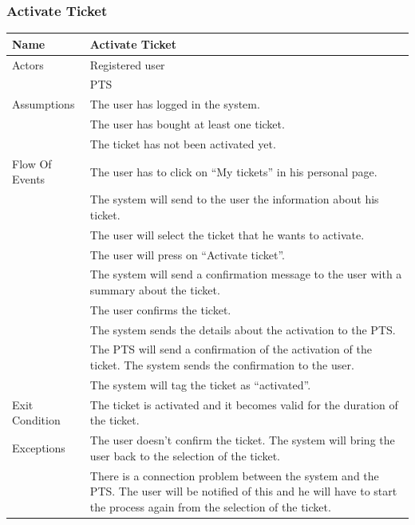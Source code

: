 \documentclass{article}
\begin{document}
\subsubsection{Activate Ticket}
\begin{center}
\begin{tabular}{| p{3cm} || p{8cm} |}
\hline
Name &Activate Ticket \\ \hline
Actors &Registered user\\&
PTS
 \\ \hline
Assumptions &The user has logged in the system.\\&
The user has bought at least one ticket.\\&
The ticket has not been activated yet.
 \\ \hline
Flow Of Events &The user has to click on “My tickets” in his personal page.\\&
The system will send to the user the information about his ticket.\\&
The user will select the ticket that he wants to activate.\\&
The user will press on “Activate ticket”.\\&
The system will send a confirmation message to the user with a summary about the ticket.\\&
The user confirms the ticket.\\&
The system sends the details about the activation to the PTS.\\&
The PTS will send a confirmation of the activation of the ticket.
The system sends the confirmation to the user.\\&
The system will tag the ticket as “activated”.
 \\ \hline
Exit Condition &The ticket is activated and it becomes valid for the duration of the ticket.  \\ \hline
Exceptions & The user doesn’t confirm the ticket. The system will bring the user back to the selection of the ticket.\\&
There is a connection problem between the system and the PTS. The user will be notified of this and he will have to start the process again from the selection of the ticket.
\\
\hline
\end{tabular}
\end{center}
\end{document}
